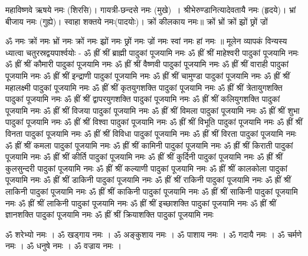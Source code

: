 महाविष्णवे ऋषये नमः (शिरसि)। गायत्री-छन्दसे नमः (मुखे)~। श्रीभेरुण्डानित्यादेवतायै नमः (हृदये)। भ्रां बीजाय नमः (गुह्ये)। स्वाहा शक्तये नमः(पादयोः)।
क्रों कीलकाय नमः॥
क्रों भ्रों क्रों झ्रों छ्रों ज्रों 

ॐ नमः क्रों नमः भ्रों नमः क्रों नमः झ्रों नमः छ्रों नमः ज्रों नमः स्वां नमः हां नमः ॥
मूलेन व्यापकं विन्यस्य ध्यात्वा चतुरस्रद्वयपार्श्वयोः -
ॐ ह्रीं श्रीं ब्राह्मी पादुकां पूजयामि नमः
ॐ ह्रीं श्रीं माहेश्वरी पादुकां पूजयामि नमः
ॐ ह्रीं श्रीं कौमारी पादुकां पूजयामि नमः
ॐ ह्रीं श्रीं वैष्णवी पादुकां पूजयामि नमः
ॐ ह्रीं श्रीं वाराही पादुकां पूजयामि नमः
ॐ ह्रीं श्रीं इन्द्राणी पादुकां पूजयामि नमः
ॐ ह्रीं श्रीं चामुण्डा पादुकां पूजयामि नमः
ॐ ह्रीं श्रीं महालक्ष्मी पादुकां पूजयामि नमः
ॐ ह्रीं श्रीं कृतयुगशक्ति पादुकां पूजयामि नमः
ॐ ह्रीं श्रीं त्रेतायुगशक्ति पादुकां पूजयामि नमः
ॐ ह्रीं श्रीं द्वापरयुगशक्ति पादुकां पूजयामि नमः
ॐ ह्रीं श्रीं कलियुगशक्ति पादुकां पूजयामि नमः
ॐ ह्रीं श्रीं विजया पादुकां पूजयामि नमः
ॐ ह्रीं श्रीं विमला पादुकां पूजयामि नमः
ॐ ह्रीं श्रीं शुभा पादुकां पूजयामि नमः
ॐ ह्रीं श्रीं विश्वा पादुकां पूजयामि नमः
ॐ ह्रीं श्रीं विभूति पादुकां पूजयामि नमः
ॐ ह्रीं श्रीं विनता पादुकां पूजयामि नमः
ॐ ह्रीं श्रीं विविधा पादुकां पूजयामि नमः
ॐ ह्रीं श्रीं विरता पादुकां पूजयामि नमः
ॐ ह्रीं श्रीं कमला पादुकां पूजयामि नमः
ॐ ह्रीं श्रीं कामिनी पादुकां पूजयामि नमः
ॐ ह्रीं श्रीं किराती पादुकां पूजयामि नमः
ॐ ह्रीं श्रीं कीर्ति पादुकां पूजयामि नमः
ॐ ह्रीं श्रीं कुर्दिनी पादुकां पूजयामि नमः
ॐ ह्रीं श्रीं कुलसुन्दरी पादुकां पूजयामि नमः
ॐ ह्रीं श्रीं कल्याणी पादुकां पूजयामि नमः
ॐ ह्रीं श्रीं कालकोला पादुकां पूजयामि नमः
ॐ ह्रीं श्रीं डाकिनी पादुकां पूजयामि नमः
ॐ ह्रीं श्रीं राकिनी पादुकां पूजयामि नमः
ॐ ह्रीं श्रीं लाकिनी पादुकां पूजयामि नमः
ॐ ह्रीं श्रीं काकिनी पादुकां पूजयामि नमः
ॐ ह्रीं श्रीं साकिनी पादुकां पूजयामि नमः
ॐ ह्रीं श्रीं लाकिनी पादुकां पूजयामि नमः
ॐ ह्रीं श्रीं इच्छाशक्ति पादुकां पूजयामि नमः
ॐ ह्रीं श्रीं ज्ञानशक्ति पादुकां पूजयामि नमः
ॐ ह्रीं श्रीं क्रियाशक्ति पादुकां पूजयामि नमः


ॐ शरेभ्यो नमः ।
ॐ खड्गाय नमः ।
ॐ अङ्कुशाय नमः ।
ॐ पाशाय नमः ।
ॐ गदायै नमः ।
ॐ  चर्मणे नमः ।
ॐ धनुषे नमः ।
ॐ वज्राय नमः ।
